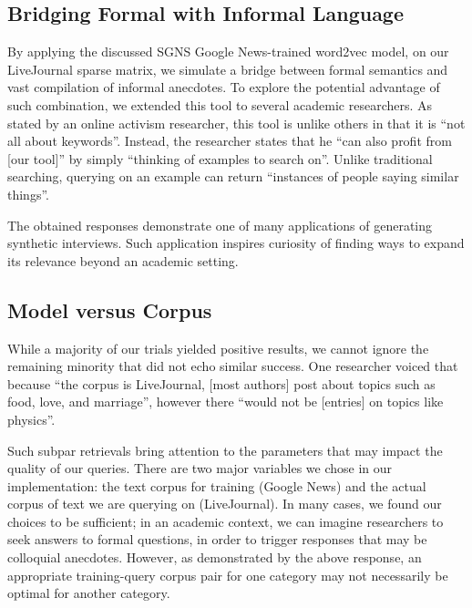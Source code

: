 \documentclass{sigchi}
\begin{document}


\subsection{Bridging Formal with Informal Language}
By applying the discussed SGNS Google News-trained word2vec model, on our LiveJournal sparse matrix, we simulate a bridge between formal semantics and vast compilation of informal anecdotes. To explore the potential advantage of such combination, we extended this tool to several academic researchers. As stated by an online activism researcher, this tool is unlike others in that it is ``not all about keywords''. Instead, the researcher states that he ``can also profit from [our tool]'' by simply ``thinking of examples to search on''. Unlike traditional searching, querying on an example can return ``instances of people saying similar things''. 

The obtained responses demonstrate one of many applications of generating synthetic interviews. Such application inspires curiosity of finding ways to expand its relevance beyond an academic setting. 

\subsection{Model versus Corpus}
While a majority of our trials yielded positive results, we cannot ignore the remaining minority that did not echo similar success. One researcher voiced that because ``the corpus is LiveJournal, [most authors] post about topics such as food, love, and marriage'', however there ``would not be [entries] on topics like physics''. 

Such subpar retrievals bring attention to the parameters that may impact the quality of our queries. There are two major variables we chose in our implementation: the text corpus for training (Google News) and the actual corpus of text we are querying on (LiveJournal). In many cases, we found our choices to be sufficient; in an academic context, we can imagine researchers to seek answers to formal questions, in order to trigger responses that may be colloquial anecdotes. However, as demonstrated by the above response, an appropriate training-query corpus pair for one category may not necessarily be optimal for another category.
\end{document}
